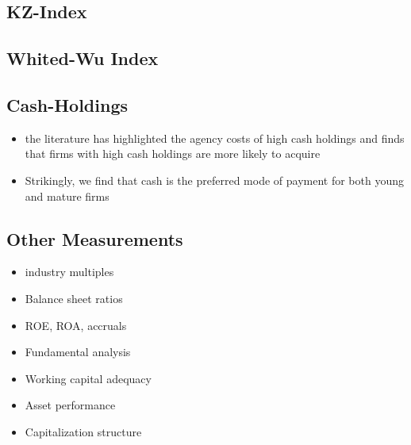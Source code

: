 \documentclass[12pt]{article}
\begin{document}
\subsection{KZ-Index}


\subsection{Whited-Wu Index}

\subsection{Cash-Holdings}

    \begin{itemize}
        \item the literature has highlighted the agency costs of high cash holdings and finds that firms with high cash holdings are more likely to acquire \citep{Arikan2016}
        \item Strikingly, we find that cash is the preferred mode of payment for both young and mature firms \citep{Arikan2016}
    \end{itemize}

\subsection{Other Measurements} 
    
    \begin{itemize}

        \item industry multiples
        \item Balance sheet ratios
        \item ROE, ROA, accruals 
        \item Fundamental analysis
        \item Working capital adequacy
        \item Asset performance
        \item Capitalization structure

    \end{itemize}
\end{document}

